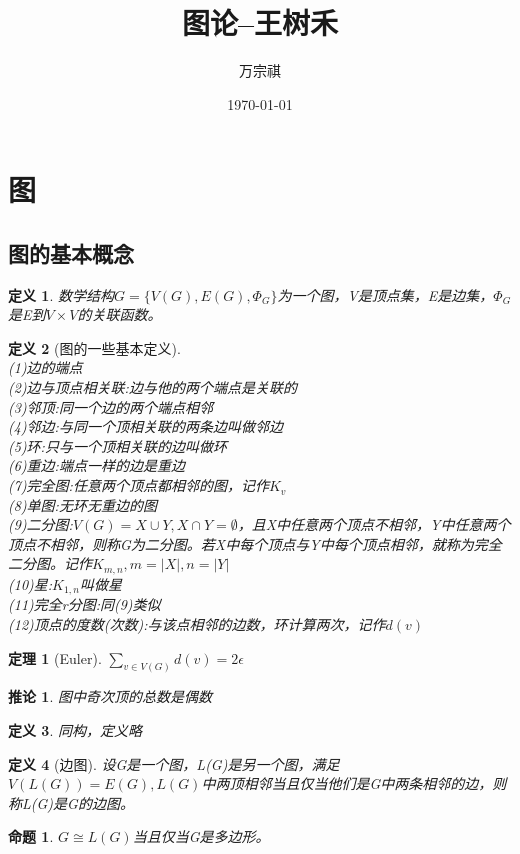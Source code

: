 \documentclass[UTF8]{ctexart}
\title{图论--王树禾}
\author{万宗祺}
\date{\today}
\newtheorem{dfnt}{定义}
\newtheorem{thr}{定理}
\newtheorem*{coro}{推论}
\newtheorem{pro}{命题}
\begin{document}
\maketitle
\tableofcontents
\section{图}
\subsection{图的基本概念}
\begin{dfnt}
数学结构$G=\{V(G),E(G),\Phi_G\}$为一个图，V是顶点集，E是边集，$\Phi_G$是E到$V \times V$的关联函数。
\end{dfnt}
\begin{dfnt}[图的一些基本定义]
\quad\\(1)边的端点\\(2)边与顶点相关联:边与他的两个端点是关联的\\(3)邻顶:同一个边的两个端点相邻\\(4)邻边:与同一个顶相关联的两条边叫做邻边\\(5)环:只与一个顶相关联的边叫做环\\(6)重边:端点一样的边是重边\\(7)完全图:任意两个顶点都相邻的图，记作$K_v$\\(8)单图:无环无重边的图\\(9)二分图:$V(G) = X \cup Y,X \cap Y = \emptyset$，且X中任意两个顶点不相邻，Y中任意两个顶点不相邻，则称G为二分图。若X中每个顶点与Y中每个顶点相邻，就称为完全二分图。记作$K_{m,n},m =|X|,n=|Y|$\\(10)星:$K_{1,n}$叫做星\\(11)完全r分图:同(9)类似\\(12)顶点的度数(次数):与该点相邻的边数，环计算两次，记作$d(v)$
\end{dfnt}
\begin{thr}[Euler]
$\sum \limits_{v \in V(G)} d(v) = 2\epsilon$
\end{thr}
\begin{coro}
图中奇次顶的总数是偶数
\end{coro}
\begin{dfnt}
同构，定义略
\end{dfnt}
\begin{dfnt}[边图]
设G是一个图，L(G)是另一个图，满足$V(L(G))=E(G),L(G)$中两顶相邻当且仅当他们是G中两条相邻的边，则称L(G)是G的边图。
\end{dfnt}
\begin{pro}
$G \cong L(G)$当且仅当G是多边形。
\end{pro}
\end{document}
